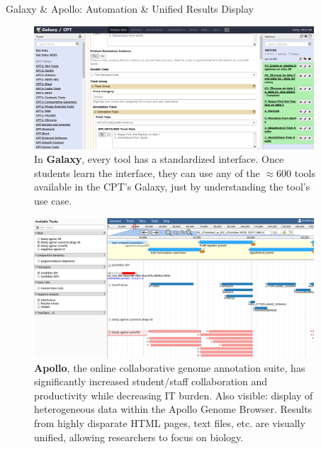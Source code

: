 \documentclass[final,t,20pt]{beamer}
\begin{document}
\begin{frame}[fragile]
\begin{columns}[t]
\begin{column}{.36\linewidth}
        \end{column}
        \begin{column}{.60\linewidth}
            \begin{block}{Galaxy \& Apollo: Automation \& Unified Results Display }
                \begin{figure}
                    \includegraphics[width=0.98\textwidth]{./media/galaxy.png}
                    \caption{In \textbf{Galaxy}, every tool has a standardized
                        interface. Once students learn the interface, they can
                        use any of the $\approx$600 tools available in the
                        CPT's Galaxy, just by understanding the tool's use case.}
                \end{figure}
                \begin{figure}
                    \includegraphics[width=0.98\textwidth]{./media/apollo.png}
                    \caption{\textbf{Apollo}, the online collaborative genome annotation
                    suite, has significantly increased student/staff
                    collaboration and productivity while decreasing IT burden.
                    Also visible: display of heterogeneous data within the Apollo
                    Genome Browser. Results from highly disparate HTML pages,
                    text files, etc. are visually unified, allowing researchers to
                    focus on biology.}
                \end{figure}


\end{block}
\end{column}
\end{columns}
\end{frame}
\end{document}

